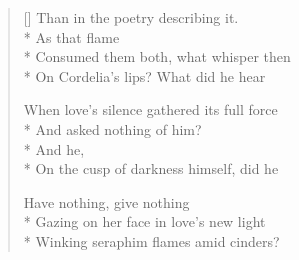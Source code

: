 \begin{verse}[\versewidth]
Than in the poetry describing it.\\*
\hspace*{3\vgap} As that flame\\*
Consumed them both, what whisper then\\*
On Cordelia's lips?  What did he hear

When love's silence gathered its full force\\*
And asked nothing of him?\\*
 And he,\\*
On the cusp of darkness himself, did he

Have nothing, give nothing\\*
Gazing on her face in love's new light\\*
Winking seraphim flames amid cinders?
\end{verse}
